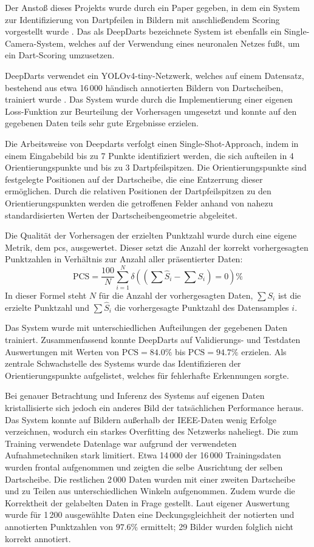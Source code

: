 Der Anstoß dieses Projekts wurde durch ein Paper gegeben, in dem ein System zur Identifizierung von Dartpfeilen in Bildern mit anschließendem Scoring vorgestellt wurde \cite{deepdarts}. Das als DeepDarts bezeichnete System ist ebenfalls ein Single-Camera-System, welches auf der Verwendung eines neuronalen Netzes fußt, um ein Dart-Scoring umzusetzen.

DeepDarts verwendet ein YOLOv4-tiny-Netzwerk, welches auf einem Datensatz, bestehend aus etwa 16\,000 händisch annotierten Bildern von Dartscheiben, trainiert wurde \cite{deepdarts-data}. Das System wurde durch die Implementierung einer eigenen Loss-Funktion zur Beurteilung der Vorhersagen umgesetzt und konnte auf den gegebenen Daten teils sehr gute Ergebnisse erzielen.

Die Arbeitsweise von Deepdarts verfolgt einen Single-Shot-Approach, indem in einem Eingabebild bis zu 7 Punkte identifiziert werden, die sich aufteilen in 4 Orientierungspunkte und bis zu 3 Dartpfeilspitzen. Die Orientierungspunkte sind festgelegte Positionen auf der Dartscheibe, die eine Entzerrung dieser ermöglichen. Durch die relativen Positionen der Dartpfeilspitzen zu den Orientierungspunkten werden die getroffenen Felder anhand von nahezu standardisierten Werten der Dartscheibengeometrie abgeleitet.

Die Qualität der Vorhersagen der erzielten Punktzahl wurde durch eine eigene Metrik, dem \ac{pcs}, ausgewertet. Dieser setzt die Anzahl der korrekt vorhergesagten Punktzahlen in Verhältnis zur Anzahl aller präsentierter Daten:
\[ \text{PCS} = \frac{100}{N} \sum_{i=1}^{N} \delta \left(\left(\sum \hat{S}_i - \sum S_i\right) = 0\right)\% \]
In dieser Formel steht $N$ für die Anzahl der vorhergesagten Daten, $\sum S_i$ ist die erzielte Punktzahl und $\sum \hat{S}_i$ die vorhergesagte Punktzahl des Datensamples $i$.

Das System wurde mit unterschiedlichen Aufteilungen der gegebenen Daten trainiert. Zusammenfassend konnte DeepDarts auf Validierungs- und Testdaten Auswertungen mit Werten von $\text{PCS} = 84.0\%$ bis $\text{PCS} = 94.7\%$ erzielen. Als zentrale Schwachstelle des Systems wurde das Identifizieren der Orientierungspunkte aufgelistet, welches für fehlerhafte Erkennungen sorgte.

Bei genauer Betrachtung und Inferenz des Systems auf eigenen Daten kristallisierte sich jedoch ein anderes Bild der tatsächlichen Performance heraus. Das System konnte auf Bildern außerhalb der IEEE-Daten wenig Erfolge verzeichnen, wodurch ein starkes Overfitting des Netzwerks naheliegt. Die zum Training verwendete Datenlage war aufgrund der verwendeten Aufnahmetechniken stark limitiert. Etwa 14\,000 der 16\,000 Trainingsdaten wurden frontal aufgenommen und zeigten die selbe Ausrichtung der selben Dartscheibe. Die restlichen 2\,000 Daten wurden mit einer zweiten Dartscheibe und zu Teilen aus unterschiedlichen Winkeln aufgenommen. Zudem wurde die Korrektheit der gelabelten Daten in Frage gestellt. Laut eigener Auswertung wurde für 1\,200 ausgewählte Daten eine Deckungsgleichheit der notierten und annotierten Punktzahlen von $97.6\%$ ermittelt; 29 Bilder wurden folglich nicht korrekt annotiert.

